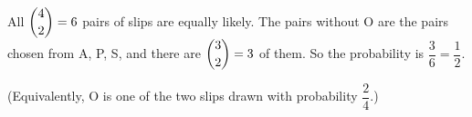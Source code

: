 All $\dbinom42=6$ pairs of slips are equally likely. The pairs without O are the pairs chosen from A, P, S, and there are $\dbinom32=3$ of them. So the probability is $\dfrac36=\boxed{\dfrac12}$.

(Equivalently, O is one of the two slips drawn with probability $\dfrac24$.)
